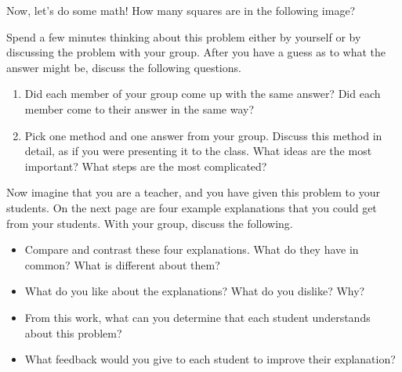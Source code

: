 \documentclass[noauthor,nooutcomes, handout]{ximera}
\begin{document}
\newpage


Now, let's do some math! How many squares are in the following image?
\begin{center}
\end{center}


\begin{problem} 
Spend a few minutes thinking about this problem either by yourself or by discussing the problem with your group.  After you have a guess as to what the answer might be, discuss the following questions.
\begin{enumerate}
\item Did each member of your group come up with the same answer?  Did each member come to their answer in the same way?



\item
Pick one method and one answer from your group.  Discuss this method in detail, as if you were presenting it to the class.  What ideas are the most important?  What steps are the most complicated?

\end{enumerate}
\end{problem}

\begin{problem} 
Now imagine that you are a teacher, and you have given this problem to your students.  On the next page are four example explanations that you could get from your students.  With your group, discuss the following.
\begin{itemize}
\item Compare and contrast these four explanations. What do they have in common? What is different about them?
\item What do you like about the explanations? What do you dislike? Why?
\item From this work, what can you determine that each student understands about this problem?
\item What feedback would you give to each student to improve their explanation?
\end{itemize}
\end{problem}
\newpage
\end{document}

